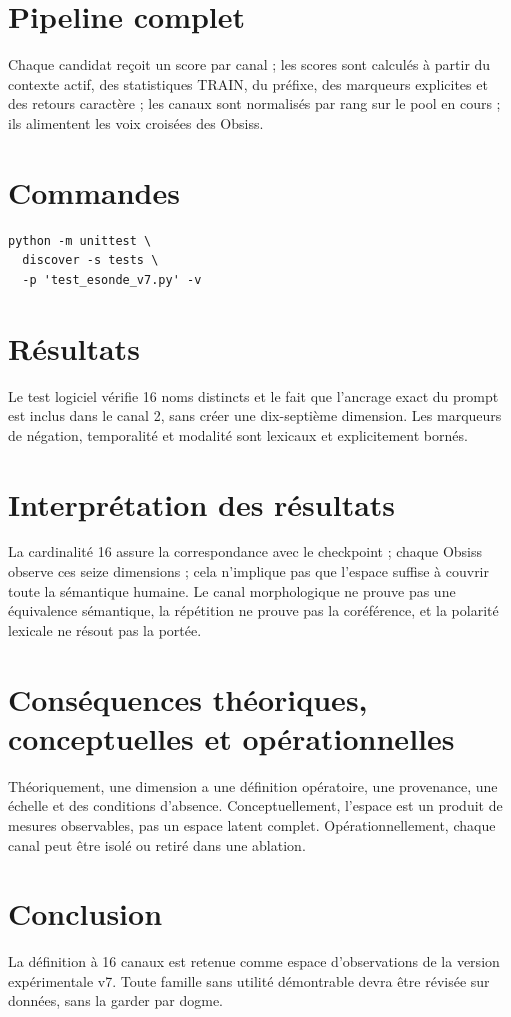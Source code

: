 \documentclass[11pt,a4paper]{report}
\begin{document}
\section{Pipeline complet}
Chaque candidat reçoit un score par canal ; les scores sont calculés à partir du contexte actif, des statistiques TRAIN, du préfixe, des marqueurs explicites et des retours caractère ; les canaux sont normalisés par rang sur le pool en cours ; ils alimentent les voix croisées des Obsiss.
\section{Commandes}
\begin{verbatim}
python -m unittest \
  discover -s tests \
  -p 'test_esonde_v7.py' -v
\end{verbatim}
\section{Résultats}
Le test logiciel vérifie 16 noms distincts et le fait que l'ancrage exact du prompt est inclus dans le canal 2, sans créer une dix-septième dimension. Les marqueurs de négation, temporalité et modalité sont lexicaux et explicitement bornés.
\section{Interprétation des résultats}
La cardinalité 16 assure la correspondance avec le checkpoint ; chaque Obsiss observe ces seize dimensions ; cela n'implique pas que l'espace suffise à couvrir toute la sémantique humaine. Le canal morphologique ne prouve pas une équivalence sémantique, la répétition ne prouve pas la coréférence, et la polarité lexicale ne résout pas la portée.
\section{Conséquences théoriques, conceptuelles et opérationnelles}
Théoriquement, une dimension a une définition opératoire, une provenance, une échelle et des conditions d'absence. Conceptuellement, l'espace est un produit de mesures observables, pas un espace latent complet. Opérationnellement, chaque canal peut être isolé ou retiré dans une ablation.
\section{Conclusion}
La définition à 16 canaux est retenue comme espace d'observations de la version expérimentale v7. Toute famille sans utilité démontrable devra être révisée sur données, sans la garder par dogme.
\end{document}
